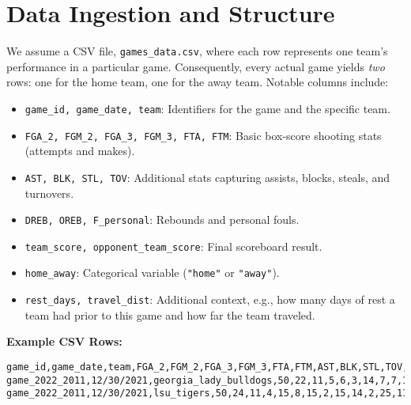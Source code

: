 \documentclass[12pt]{article}
\begin{document}
\section{Data Ingestion and Structure}
We assume a CSV file, \texttt{games\_data.csv}, where each row represents one team's performance in a particular game. Consequently, every actual game yields \emph{two} rows: one for the home team, one for the away team. Notable columns include:

\begin{itemize}[noitemsep]
    \item \texttt{game\_id, game\_date, team}: Identifiers for the game and the specific team.
    \item \texttt{FGA\_2, FGM\_2, FGA\_3, FGM\_3, FTA, FTM}: Basic box-score shooting stats (attempts and makes).
    \item \texttt{AST, BLK, STL, TOV}: Additional stats capturing assists, blocks, steals, and turnovers.
    \item \texttt{DREB, OREB, F\_personal}: Rebounds and personal fouls.
    \item \texttt{team\_score, opponent\_team\_score}: Final scoreboard result.
    \item \texttt{home\_away}: Categorical variable (\texttt{"home"} or \texttt{"away"}).
    \item \texttt{rest\_days, travel\_dist}: Additional context, e.g., how many days of rest a team had prior to this game and how far the team traveled.
\end{itemize}

\noindent
\textbf{Example CSV Rows:}
\begin{lstlisting}[language=csv]
game_id,game_date,team,FGA_2,FGM_2,FGA_3,FGM_3,FTA,FTM,AST,BLK,STL,TOV,TOV_team,DREB,OREB,F_tech,F_personal,team_score,opponent_team_score,largest_lead,notD1_incomplete,OT_length_min_tot,rest_days,attendance,tz_dif_H_E,prev_game_dist,home_away,home_away_NS,travel_dist
game_2022_2011,12/30/2021,georgia_lady_bulldogs,50,22,11,5,6,3,14,7,7,18,0,25,11,0,18,62,68,1.0,False,,9.0,3241.0,0.0,0.0,home,1,0.0
game_2022_2011,12/30/2021,lsu_tigers,50,24,11,4,15,8,15,2,15,14,2,25,11,0,7,68,62,14.0,False,,3.0,3241.0,0.0,824.0,away,-1,824.0
\end{lstlisting}
\end{document}
